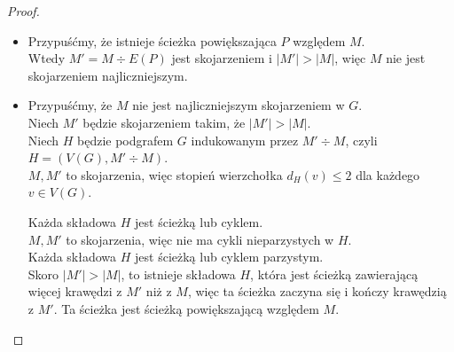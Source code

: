 \begin{proof} ~
\begin{itemize}
	\item[$\implies$]
	      Przypuśćmy, że istnieje ścieżka powiększająca $P$ względem $M$. \\
	      Wtedy $M' = M \div E(P)$ jest skojarzeniem i $|M'| > |M|$, więc $M$ nie jest skojarzeniem najliczniejszym.
	\item[$\impliedby$]
	      Przypuśćmy, że $M$ nie jest najliczniejszym skojarzeniem w $G$. \\
	      Niech $M'$ będzie skojarzeniem takim, że $|M'| > |M|$. \\
	      Niech $H$ będzie podgrafem $G$ indukowanym przez $M' \div M$, czyli $H = (V(G), M' \div M)$. \\
	      $M, M'$ to skojarzenia, więc stopień wierzchołka $d_H(v) \le 2$ dla każdego $v \in V(G)$.

	      Każda składowa $H$ jest ścieżką lub cyklem. \\
	      $M, M'$ to skojarzenia, więc nie ma cykli nieparzystych w $H$. \\
	      Każda składowa $H$ jest ścieżką lub cyklem parzystym. \\
	      Skoro $|M'| > |M|$, to istnieje składowa $H$, która jest ścieżką zawierającą więcej krawędzi z $M'$ niż z $M$, więc ta ścieżka zaczyna się i kończy krawędzią z $M'$. Ta ścieżka jest ścieżką powiększającą względem $M$.
\end{itemize}
\end{proof}
